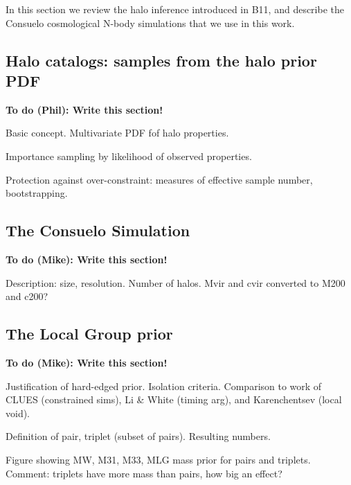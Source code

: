 \documentclass[iop,apj]{emulateapj}
\newcommand{\consuelo}{{\sc Consuelo }}
\newcommand{\todo}[2]{{\bf To do (#1): #2}}
\begin{document}
In this section we review the halo inference introduced in B11, and describe
the \consuelo cosmological N-body simulations that we use in this work.


\subsection{Halo catalogs: samples from the halo prior PDF}
\label{sec:sampling}

\todo{Phil}{Write this section!}

Basic concept. Multivariate PDF fof halo properties.

Importance sampling by likelihood of observed properties.

Protection against over-constraint: measures of effective sample number,
bootstrapping.


\subsection{The \consuelo Simulation}
\label{sec:sampling}

\todo{Mike}{Write this section!}

Description: size, resolution. Number of halos. Mvir and cvir converted to M200
and c200?



\subsection{The Local Group prior}
\label{sec:sampling}

\todo{Mike}{Write this section!}

Justification of hard-edged prior. Isolation criteria. Comparison to work of
CLUES (constrained sims), Li \& White (timing arg), and Karenchentsev (local
void). 

Definition of pair, triplet (subset of pairs). Resulting numbers. 

Figure showing MW, M31, M33, MLG mass prior for pairs and triplets. Comment:
triplets have more mass than pairs, how big an effect?

\end{document}
